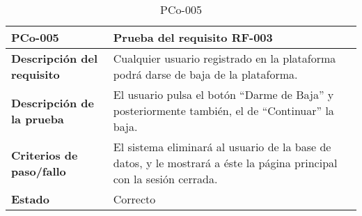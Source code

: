 \begin{table}[htpb]
\centering
\begin{tabularx}{\textwidth}{|l|X|}
\hline
\rowcolor[gray]{0.9}\textbf{PCo-005}                     & \textbf{Prueba del requisito RF-003}                                                                                 \\ \hline
\textbf{Descripción del requisito} & Cualquier usuario registrado en la plataforma podrá darse de baja de la plataforma.                                  \\ \hline
\textbf{Descripción de la prueba}  & El usuario pulsa el botón ``Darme de Baja'' y posteriormente también, el de ``Continuar'' la baja.                      \\ \hline
\textbf{Criterios de paso/fallo}   & El sistema eliminará al usuario de la base de datos, y le mostrará a éste la página principal con la sesión cerrada. \\ \hline
\textbf{Estado}                    & Correcto                                                                                                             \\ \hline
\end{tabularx}
\caption{PCo-005}
\end{table}


